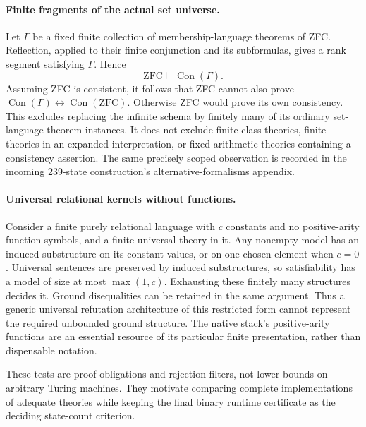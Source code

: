 \paragraph{Finite fragments of the actual set universe.}
Let $\Gamma$ be a fixed finite collection of membership-language theorems
of ZFC.  Reflection, applied to their finite conjunction and its
subformulas, gives a rank segment satisfying $\Gamma$.  Hence
\[
 \mathrm{ZFC}\vdash\operatorname{Con}(\Gamma).
\]
Assuming ZFC is consistent, it follows that ZFC cannot also prove
$\operatorname{Con}(\Gamma)\leftrightarrow
\operatorname{Con}(\mathrm{ZFC})$.  Otherwise ZFC would prove its own
consistency.  This excludes replacing the infinite schema by finitely
many of its ordinary set-language theorem instances.  It does not exclude
finite class theories, finite theories in an expanded interpretation,
or fixed arithmetic theories containing a consistency assertion.
The same precisely scoped observation is recorded in the incoming
239-state construction's alternative-formalisms appendix.

\paragraph{Universal relational kernels without functions.}
Consider a finite purely relational language with $c$ constants and no
positive-arity function symbols, and a finite universal theory in it.
Any nonempty model has an induced substructure on its constant values,
or on one chosen element when $c=0$.  Universal sentences are preserved
by induced substructures, so satisfiability has a model of size at most
$\max(1,c)$.  Exhausting these finitely many structures decides it.
Ground disequalities can be retained in the same argument.  Thus a
generic universal refutation architecture of this restricted form
cannot represent the required unbounded ground structure.  The native
stack's positive-arity functions are an essential resource of its
particular finite presentation, rather than dispensable notation.

These tests are proof obligations and rejection filters, not lower
bounds on arbitrary Turing machines.  They motivate comparing complete
implementations of adequate theories while keeping the final binary
runtime certificate as the deciding state-count criterion.
